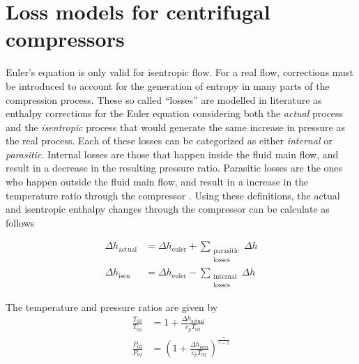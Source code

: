 \documentclass[tcc]{subfiles}
\begin{document}
\section{Loss models for centrifugal compressors}
\label{sec:compressor_losses}
Euler's equation is only valid for isentropic flow. 
For a real flow, corrections must be introduced to account for the generation of entropy in many parts of the compression process. 
These so called ``losses'' are modelled in literature as enthalpy corrections 
for the Euler equation considering both the \emph{actual} process and the \emph{isentropic} process 
that would generate the same increase in pressure as the real process.
Each of these losses can be categorized as either \emph{internal} or \emph{parasitic}.
Internal losses are those that happen inside the fluid main flow, and result in a decrease in the resulting pressure ratio.
Parasitic losses are the ones who happen outside the fluid main flow, 
and result in a increase in the temperature ratio through the compressor \cite{Galvas1973}.
Using these definitions, the actual and isentropic enthalpy changes through the compressor can be calculate as follows

\begin{align}
    \Delta h_{\text{actual}} &= \Delta h_{\text{euler}} + \sum_{\substack{
                                                            \text{parasitic} \\ 
                                                            \text{losses}
                                                        }}
                                                          \Delta h \\
    \Delta h_{\text{isen}}  &= \Delta h_{\text{euler}} - \sum_{\substack{
                                                            \text{internal} \\ 
                                                            \text{losses}
                                                        }}
                                                          \Delta h
\end{align}

The temperature and pressure ratios are given by
\begin{align}
    \frac{T_{03}}{T_{02}} &= 1 + \frac{\Delta h_{\text{actual}}}{c_p T_{02}} \\
    \frac{P_{03}}{P_{02}} &= \left( 1 + \frac{\Delta h_{\text{isen}}}{c_p T_{02}}\right)^{\frac{\gamma}{\gamma-1}}
\end{align}
\end{document}
